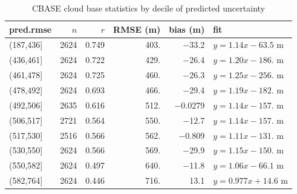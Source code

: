 \documentclass[amt,manuscript]{copernicus}\usepackage[]{graphicx}\usepackage[]{color}
\begin{document}
\begin{table}[t]
  \centering
  \caption{CBASE cloud base statistics by decile of predicted uncertainty}
  \label{tab:rmseclass}

\begin{tabular}{lrrrrl}
  \hline
\hline
pred.rmse & $n$ & $r$ & RMSE (m) & bias (m) & fit \\ 
  \hline
(187,436] & 2624 & 0.749 & 403. & $-$33.2 & $y = 1.14 x - 63.5$ m \\ 
  (436,461] & 2624 & 0.722 & 429. & $-$26.4 & $y = 1.20 x - 186.$ m \\ 
  (461,478] & 2624 & 0.725 & 460. & $-$26.3 & $y = 1.25 x - 256.$ m \\ 
  (478,492] & 2624 & 0.693 & 466. & $-$29.4 & $y = 1.19 x - 182.$ m \\ 
  (492,506] & 2635 & 0.616 & 512. & $-$0.0279 & $y = 1.14 x - 157.$ m \\ 
  (506,517] & 2721 & 0.564 & 550. & $-$12.7 & $y = 1.14 x - 157.$ m \\ 
  (517,530] & 2516 & 0.566 & 562. & $-$0.809 & $y = 1.11 x - 131.$ m \\ 
  (530,550] & 2624 & 0.566 & 569. & $-$29.9 & $y = 1.15 x - 150.$ m \\ 
  (550,582] & 2624 & 0.497 & 640. & $-$11.8 & $y = 1.06 x - 66.1$ m \\ 
  (582,764] & 2624 & 0.446 & 716. & 13.1 & $y = 0.977 x + 14.6$ m \\ 
   \hline
\hline
\end{tabular}

\end{table}
\end{document}
